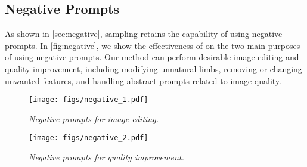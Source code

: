\subsection{Negative Prompts}
As shown in \cref{sec:negative}, \ourName sampling retains the capability of using negative prompts.
In \cref{fig:negative}, we show the effectiveness of \ourName on the two main purposes of using negative prompts.
Our method can perform desirable image editing and quality improvement, including modifying unnatural limbs, removing or changing unwanted features, and handling abstract prompts related to image quality.
\begin{figure*}[t]
    \begin{subfigure}[t]{0.488\textwidth}
        \texttt{[image: figs/negative\_1.pdf]}
        \caption{\small \it Negative prompts for image editing.}
    \end{subfigure}
    \hfill
    \begin{subfigure}[t]{0.50\textwidth}
        \texttt{[image: figs/negative\_2.pdf]}
        \caption{\small \it Negative prompts for quality improvement.}
    \end{subfigure}
    \captionsetup{skip=5pt}
    \caption{\small \it Performance of \ourName on negative prompts. Positive and negative prompts are denoted by $+$ and $-$.}
    \label{fig:negative}
~\vspace{-2em}
\end{figure*}


